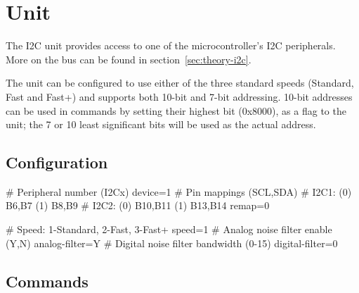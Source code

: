 \section{\IIC Unit}

The \gls{I2C} unit provides access to one of the microcontroller's \gls{I2C} peripherals. More on the \IIC bus can be found in section~\ref{sec:theory-i2c}.

The unit can be configured to use either of the three standard speeds (Standard, Fast and Fast+) and supports both 10-bit and 7-bit addressing. 10-bit addresses can be used in commands by setting their highest bit (0x8000), as a flag to the unit; the 7 or 10 least significant bits will be used as the actual address.

\subsection{\IIC Configuration}

\begin{inicode}
[I2C:d@4]
# Peripheral number (I2Cx)
device=1
# Pin mappings (SCL,SDA)
#  I2C1: (0) B6,B7    (1) B8,B9
#  I2C2: (0) B10,B11  (1) B13,B14
remap=0

# Speed: 1-Standard, 2-Fast, 3-Fast+
speed=1
# Analog noise filter enable (Y,N)
analog-filter=Y
# Digital noise filter bandwidth (0-15)
digital-filter=0
\end{inicode}

\subsection{\IIC Commands}

